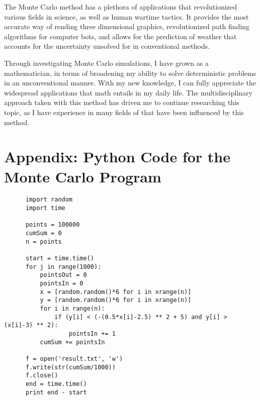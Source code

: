 \documentclass[10pt, letterpaper]{article}
\begin{document}
  The Monte Carlo method has a plethora of applications that revolutionized various fields in science, as well as human wartime tactics.
  It provides the most accurate way of rending three dimensional graphics, revolutionized path finding algorithms for computer bots, and
  allows for the prediction of weather that accounts for the uncertainty unsolved for in conventional methods.

  Through investigating Monte Carlo simulations, I have grown as a mathematician, in terms of broadening my ability to solve deterministic
  problems in an unconventional manner. With my new knowledge, I can fully appreciate the widespread applications that math entails in my daily
  life. The multidisciplinary approach taken with this method has driven me to continue researching this topic, as I have experience
  in many fields of that have been influenced by this method.

  \newpage
  \appendix
  \section{Appendix: Python Code for the Monte Carlo Program}
    \begin{lstlisting}
      import random
      import time

      points = 100000
      cumSum = 0
      n = points

      start = time.time()
      for j in range(1000):
          pointsOut = 0
          pointsIn = 0
          x = [random.random()*6 for i in xrange(n)]
          y = [random.random()*6 for i in xrange(n)]
          for i in range(n):
              if (y[i] < (-(0.5*x[i]-2.5) ** 2 + 5) and y[i] > (x[i]-3) ** 2):
                  pointsIn += 1
          cumSum += pointsIn

      f = open('result.txt', 'w')
      f.write(str(cumSum/1000))
      f.close()
      end = time.time()
      print end - start
    \end{lstlisting}
\end{document}
